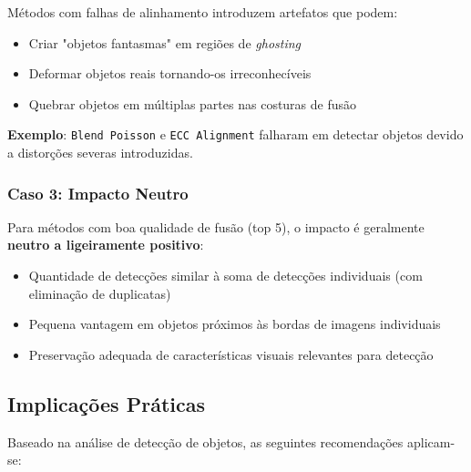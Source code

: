 Métodos com falhas de alinhamento introduzem artefatos que podem:
\begin{itemize}
    \item Criar "objetos fantasmas" em regiões de \textit{ghosting}
    \item Deformar objetos reais tornando-os irreconhecíveis
    \item Quebrar objetos em múltiplas partes nas costuras de fusão
\end{itemize}

\textbf{Exemplo}: \texttt{Blend Poisson} e \texttt{ECC Alignment} falharam em detectar objetos devido a distorções severas introduzidas.

\subsubsection{Caso 3: Impacto Neutro}

Para métodos com boa qualidade de fusão (top 5), o impacto é geralmente \textbf{neutro a ligeiramente positivo}:
\begin{itemize}
    \item Quantidade de detecções similar à soma de detecções individuais (com eliminação de duplicatas)
    \item Pequena vantagem em objetos próximos às bordas de imagens individuais
    \item Preservação adequada de características visuais relevantes para detecção
\end{itemize}

\subsection{Implicações Práticas}

Baseado na análise de detecção de objetos, as seguintes recomendações aplicam-se:

